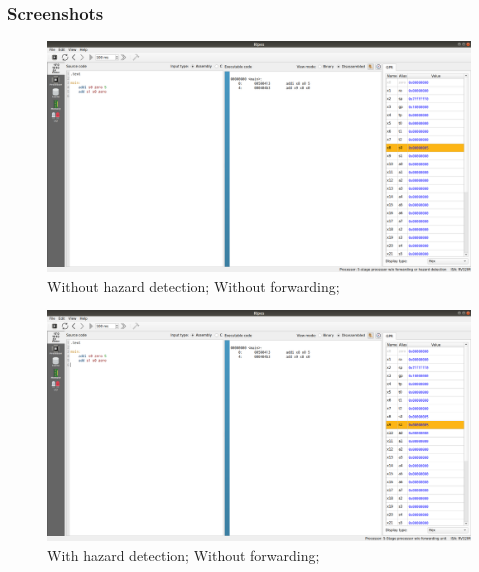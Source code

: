 \documentclass[12pt, fleqn]{article}
\begin{document}
\subsubsection*{Screenshots}
\begin{figure}[H]
  \centering
  \includegraphics[scale=0.25]{Q1/nhnf_end_editor.png}
  \caption{Without hazard detection; Without forwarding;}
\end{figure}
\begin{figure}[H]
  \centering
  \includegraphics[scale=0.25]{Q1/hnf_end_editor.png}
  \caption{With hazard detection; Without forwarding;}
\end{figure}
\end{document}
